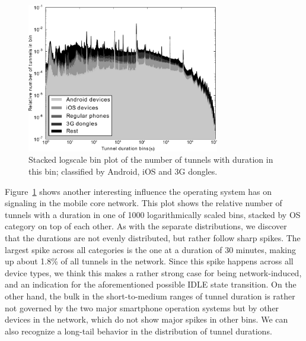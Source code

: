 \begin{figure}
\centering
\includegraphics[width=0.75\textwidth]{images/CONEXT2012/stacked-durations-2-fixed.pdf}
\caption{Stacked logscale bin plot of the number of tunnels with duration in this bin; classified by Android, iOS and 3G dongles.}
\label{fig:stacked-durations}
\end{figure}

Figure~\ref{fig:stacked-durations} shows another interesting influence the operating system has on signaling in the mobile core network. This plot shows the relative number of tunnels with a duration in one of 1000 logarithmically scaled bins, stacked by OS category on top of each other. As with the separate distributions, we discover that the durations are not evenly distributed, but rather follow sharp spikes. The largest spike across all categories is the one at a duration of 30 minutes, making up about 1.8\% of all tunnels in the network. Since this spike happens across all device types, we think this makes a rather strong case for being network-induced, and an indication for the aforementioned possible IDLE state transition. On the other hand, the bulk in the short-to-medium ranges of tunnel duration is rather not governed by the two major smartphone operation systems but by other devices in the network, which do not show major spikes in other bins. We can also recognize a long-tail behavior in the distribution of tunnel durations.



